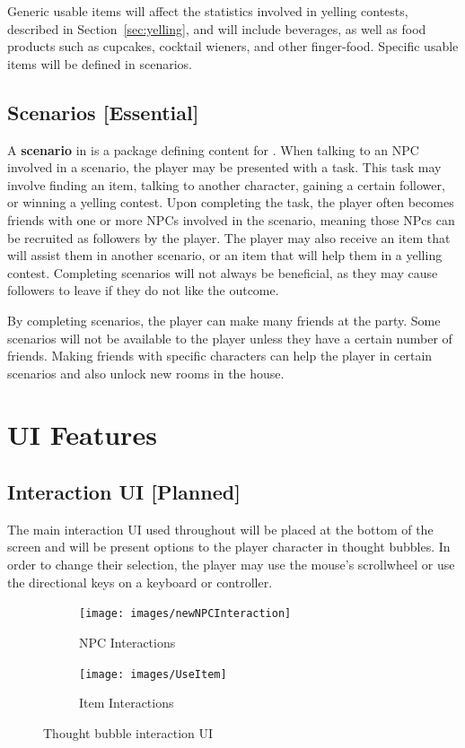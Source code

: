 \documentclass{GlobalDocument}
\begin{document}
Generic usable items will affect the statistics involved in yelling contests, described in Section~\ref{sec:yelling}, and will include beverages, as well as food products such as cupcakes, cocktail wieners, and other finger-food. Specific usable items will be defined in scenarios.


\subsection{Scenarios [Essential]}
A \textbf{scenario} in \ourgame{} is a package defining content for \ourgame{}. When talking to an NPC involved in a scenario, the player may be presented with a task. This task may involve finding an item, talking to another character, gaining a certain follower, or winning a yelling contest. Upon completing the task, the player often becomes friends with one or more NPCs involved in the scenario, meaning those NPcs can be recruited as followers by the player. The player may also receive an item that will assist them in another scenario, or an item that will help them in a yelling contest. Completing scenarios will not always be beneficial, as they may cause followers to leave if they do not like the outcome.

By completing scenarios, the player can make many friends at the party. Some scenarios will not be available to the player unless they have a certain number of friends. Making friends with specific characters can help the player in certain scenarios and also unlock new rooms in the house.


\section{UI Features}
\subsection{Interaction UI [Planned]}
\label{sec:interaction_UI}
The main interaction UI used throughout \ourgame{} will be placed at the bottom of the screen and will be present options to the player character in thought bubbles. In order to change their selection, the player may use the mouse's scrollwheel or use the directional keys on a keyboard or controller.

\begin{figure}[htb]
  \begin{subfigure}{.48\textwidth}
    \centering
    \texttt{[image: images/newNPCInteraction]}
    \caption{NPC Interactions}
  \end{subfigure}%
  \begin{subfigure}{.48\textwidth}
    \centering
    \texttt{[image: images/UseItem]}
    \caption{Item Interactions}
  \end{subfigure}
  \caption{Thought bubble interaction UI}
  \label{fig:interaction_UI}
\end{figure}
\end{document}
